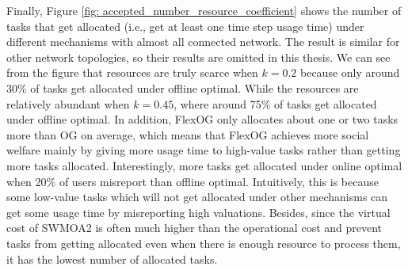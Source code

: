 \documentclass[11pt]{phdthesis}
\begin{document}
Finally, Figure \ref{fig: accepted_number_resource_coefficient} shows the number of tasks that get allocated (i.e., get at least one time step usage time) under different mechanisms with almost all connected network. The result is similar for other network topologies, so their results are omitted in this thesis. We can see from the figure that resources are truly scarce when $ k= 0.2 $ because only around 30\% of tasks get allocated under offline optimal. While the resources are relatively abundant when $ k = 0.45 $, where around 75\% of tasks get allocated under offline optimal. In addition, FlexOG only allocates about one or two tasks more than OG on average, which means that FlexOG achieves more social welfare mainly by giving more usage time to high-value tasks rather than getting more tasks allocated. Interestingly, more tasks get allocated under online optimal when 20\% of users misreport than offline optimal. Intuitively, this is because some low-value tasks which will not get allocated under other mechanisms can get some usage time by misreporting high valuations. Besides, since the virtual cost of SWMOA2 is often much higher than the operational cost and prevent tasks from getting allocated even when there is enough resource to process them, it has the lowest number of allocated tasks. 


%

%
\end{document}
